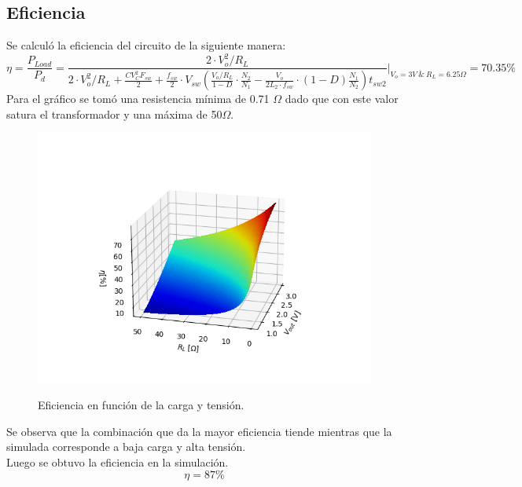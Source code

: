 \subsection{Eficiencia}
Se calculó la eficiencia del circuito de la siguiente manera:
\begin{equation}
\eta =\frac{P_{Load}}{P_{d}} = \frac{2 \cdot V_o^2 / R_L}{2 \cdot V_o^2 / R_L + \frac{CV_C^2 F_{sw}}{2} + \frac{f_{sw}}{2} \cdot V_{sw} \left( \frac{V_o / R_L}{1-D} \cdot \frac{N_2}{N_1} - \frac{V_o}{2L_2 \cdot f_{sw}} \cdot (1-D) \frac{N_1}{N_2}  \right) t_{sw2} } \Big\rvert_{V_o=3 V\ \& \ R_L=6.25 \Omega } = 70.35\%
\end{equation}
Para el gráfico se tomó una resistencia mínima de 0.71 $\Omega$ dado que con este valor satura el transformador y una máxima de 50$\Omega$.
\begin{figure}[H]
	\centering
	\includegraphics[width=0.5\linewidth]{ImagenesParteII/Eff.png}
	\label{fig:etar}
	\caption{Eficiencia en función de la carga y tensión.}
\end{figure}
Se observa que la combinación que da la mayor eficiencia tiende 
mientras que la simulada corresponde a baja carga y alta tensión.\\
Luego se obtuvo la eficiencia en la simulación.
\begin{equation}
\eta = 87\%
\end{equation}
%
